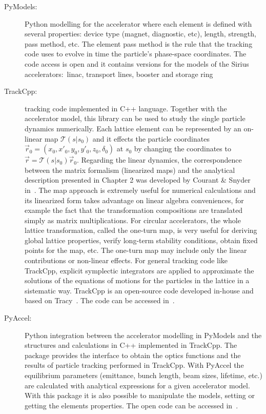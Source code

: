 \begin{description}
    \item[PyModels:] Python modelling for the accelerator where each element is defined with several properties: device type (magnet, diagnostic, etc), length, strength, pass method, etc. The element pass method is the rule that the tracking code uses to evolve in time the particle's phase-space coordinates. The code access is open and it contains versions for the models of the Sirius accelerators:~\gls{linac}, transport lines, booster and storage ring~\cite{pymodels}
    \item[TrackCpp:] tracking code implemented in C++ language. Together with the accelerator model, this library can be used to study the single particle dynamics numerically. Each lattice element can be represented by an on-linear map $\mathcal{T}(s|s_0)$ and it effects the particle coordinates $\vec{r}_0 = \left(x_0, x'_0, y_0, y'_0, z_0, \delta_0\right)$ at $s_0$ by changing the coordinates to $\vec{r} = \mathcal{T}(s|s_0)\vec{r}_0$. Regarding the linear dynamics, the correspondence between the matrix formalism (linearized maps) and the analytical description presented in Chapter 2 was developed by Courant \& Snyder in~\cite{CourantSnyder1958}. The map approach is extremely useful for numerical calculations and its linearized form takes advantage on linear algebra conveniences, for example the fact that the transformation compositions are translated simply as matrix multiplications. For circular accelerators, the whole lattice transformation, called the one-turn map, is very useful for deriving global lattice properties, verify long-term stability conditions, obtain fixed points for the map, etc. The one-turn map may include only the linear contributions or non-linear effects. For general tracking code like TrackCpp, explicit symplectic integrators are applied to approximate the solutions of the equations of motions for the particles in the lattice in a sistematic way. TrackCpp is an open-source code developed in-house and based on Tracy~\cite{tracy}. The code can be accessed in~\cite{trackcpp}.
    \item[PyAccel:] Python integration between the accelerator modelling in PyModels and the structures and calculations in C++ implemented in TrackCpp. The package provides the interface to obtain the optics functions and the results of particle tracking performed in TrackCpp. With PyAccel the equilibrium parameters (emittance, bunch length, beam sizes, lifetime, etc.) are calculated with analytical expressions for a given accelerator model. With this package it is also possible to manipulate the models, setting or getting the elements properties. The open code can be accessed in~\cite{pyaccel}.
\end{description}


